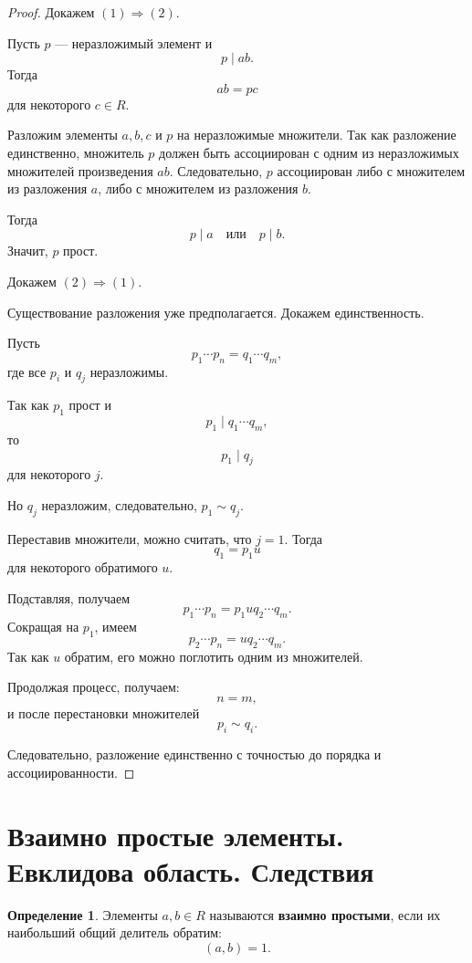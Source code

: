 \documentclass[12pt, a4paper]{article}
\theoremstyle{definition}
\newtheorem{definition}{Определение}
\theoremstyle{remark}
\begin{document}
\begin{proof}
	Докажем $(1)\Rightarrow(2)$.
	
	Пусть $p$ --- неразложимый элемент и
	\[
	p \mid ab.
	\]
	Тогда
	\[
	ab=pc
	\]
	для некоторого $c \in R$.
	
	Разложим элементы $a,b,c$ и $p$ на неразложимые множители.
	Так как разложение единственно, множитель $p$ должен быть ассоциирован
	с одним из неразложимых множителей произведения $ab$.
	Следовательно, $p$ ассоциирован либо с множителем из разложения $a$,
	либо с множителем из разложения $b$.
	
	Тогда
	\[
	p \mid a
	\quad \text{или} \quad
	p \mid b.
	\]
	Значит, $p$ прост.
	
	Докажем $(2)\Rightarrow(1)$.
	
	Существование разложения уже предполагается. Докажем единственность.
	
	Пусть
	\[
	p_1\cdots p_n=q_1\cdots q_m,
	\]
	где все $p_i$ и $q_j$ неразложимы.
	
	Так как $p_1$ прост и
	\[
	p_1 \mid q_1\cdots q_m,
	\]
	то
	\[
	p_1 \mid q_j
	\]
	для некоторого $j$.
	
	Но $q_j$ неразложим, следовательно, $p_1 \sim q_j$.
	
	Переставив множители, можно считать, что $j=1$.
	Тогда
	\[
	q_1=p_1u
	\]
	для некоторого обратимого $u$.
	
	Подставляя, получаем
	\[
	p_1\cdots p_n=p_1u q_2\cdots q_m.
	\]
	Сокращая на $p_1$, имеем
	\[
	p_2\cdots p_n=u q_2\cdots q_m.
	\]
	Так как $u$ обратим, его можно поглотить одним из множителей.
	
	Продолжая процесс, получаем:
	\[
	n=m,
	\]
	и после перестановки множителей
	\[
	p_i \sim q_i.
	\]
	
	Следовательно, разложение единственно с точностью до порядка и
	ассоциированности.
\end{proof}

\section{Взаимно простые элементы. Евклидова область. Следствия}

\begin{definition}
	Элементы $a,b \in R$ называются \textbf{взаимно простыми}, если их наибольший общий делитель обратим:
	\[
	(a,b)=1.
	\]
\end{definition}
\end{document}
